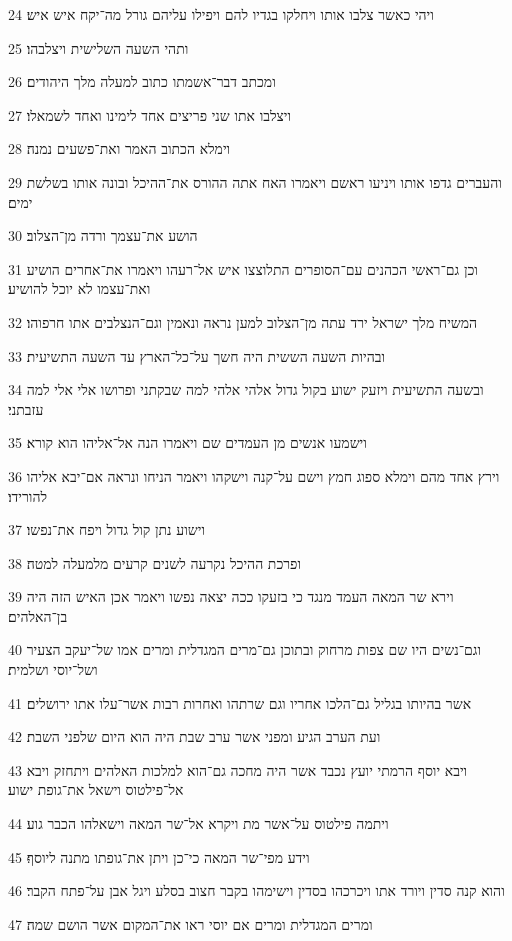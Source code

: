 \par 24 ויהי כאשר צלבו אותו ויחלקו בגדיו להם ויפילו עליהם גורל מה־יקח איש איש׃
\par 25 ותהי השעה השלישית ויצלבהו׃
\par 26 ומכתב דבר־אשמתו כתוב למעלה מלך היהודים׃
\par 27 ויצלבו אתו שני פריצים אחד לימינו ואחד לשמאלו׃
\par 28 וימלא הכתוב האמר ואת־פשעים נמנה׃
\par 29 והעברים גדפו אותו ויניעו ראשם ויאמרו האח אתה ההורס את־ההיכל ובונה אותו בשלשת ימים׃
\par 30 הושע את־עצמך ורדה מן־הצלוב׃
\par 31 וכן גם־ראשי הכהנים עם־הסופרים התלוצצו איש אל־רעהו ויאמרו את־אחרים הושיע ואת־עצמו לא יוכל להושיע׃
\par 32 המשיח מלך ישראל ירד עתה מן־הצלוב למען נראה ונאמין וגם־הנצלבים אתו חרפוהו׃
\par 33 ובהיות השעה הששית היה חשך על־כל־הארץ עד השעה התשיעית׃
\par 34 ובשעה התשיעית ויזעק ישוע בקול גדול אלהי אלהי למה שבקתני ופרושו אלי אלי למה עזבתני׃
\par 35 וישמעו אנשים מן העמדים שם ויאמרו הנה אל־אליהו הוא קורא׃
\par 36 וירץ אחד מהם וימלא ספוג חמץ וישם על־קנה וישקהו ויאמר הניחו ונראה אם־יבא אליהו להורידו׃
\par 37 וישוע נתן קול גדול ויפח את־נפשו׃
\par 38 ופרכת ההיכל נקרעה לשנים קרעים מלמעלה למטה׃
\par 39 וירא שר המאה העמד מנגד כי בזעקו ככה יצאה נפשו ויאמר אכן האיש הזה היה בן־האלהים׃
\par 40 וגם־נשים היו שם צפות מרחוק ובתוכן גם־מרים המגדלית ומרים אמו של־יעקב הצעיר ושל־יוסי ושלמית׃
\par 41 אשר בהיותו בגליל גם־הלכו אחריו וגם שרתהו ואחרות רבות אשר־עלו אתו ירושלים׃
\par 42 ועת הערב הגיע ומפני אשר ערב שבת היה הוא היום שלפני השבת׃
\par 43 ויבא יוסף הרמתי יועץ נכבד אשר היה מחכה גם־הוא למלכות האלהים ויתחזק ויבא אל־פילטוס וישאל את־גופת ישוע׃
\par 44 ויתמה פילטוס על־אשר מת ויקרא אל־שר המאה וישאלהו הכבר גוע׃
\par 45 וידע מפי־שר המאה כי־כן ויתן את־גופתו מתנה ליוסף׃
\par 46 והוא קנה סדין ויורד אתו ויכרכהו בסדין וישימהו בקבר חצוב בסלע ויגל אבן על־פתח הקבר׃
\par 47 ומרים המגדלית ומרים אם יוסי ראו את־המקום אשר הושם שמה׃

